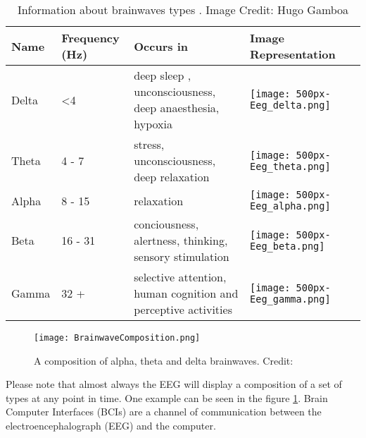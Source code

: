 \begin{table}[h]
                             
\begin{tabular}{ | C | C | C | m{8cm}C | }
\hline
\textbf{Name}  & \textbf{Frequency (Hz)} & \textbf{Occurs in} & \textbf{Image Representation} \\ \hline
Delta & \textless 4    & deep sleep , unconsciousness, deep anaesthesia, hypoxia          & \texttt{[image: 500px-Eeg\_delta.png]}        \\ \hline
Theta & 4 - 7          & stress, unconsciousness, deep relaxation          & \texttt{[image: 500px-Eeg\_theta.png]}        \\ \hline
Alpha & 8 - 15         & relaxation          & \texttt{[image: 500px-Eeg\_alpha.png]}        \\ \hline
Beta  & 16 - 31        & conciousness, alertness, thinking, sensory stimulation          & \texttt{[image: 500px-Eeg\_beta.png]}         \\ \hline
Gamma & 32 +           & selective attention, human cognition and perceptive activities         & \texttt{[image: 500px-Eeg\_gamma.png]}        \\ \hline
\end{tabular}
\caption {Information about brainwaves types \cite{musicEEG}. Image Credit: Hugo Gamboa}
\label{table:brainwaves}
\end{table}

\begin{figure}
  \centering
  \texttt{[image: BrainwaveComposition.png]}
  \caption{A composition of alpha, theta and delta brainwaves. Credit: \cite{gall1992method}}
    \label{fig:brainwaveComposition}        
\end{figure}

Please note that almost always the EEG will display a composition of a set of types at any point in time. One example can be seen in the figure \ref{fig:brainwaveComposition}. Brain Computer Interfaces (BCIs) are a channel of communication between the electroencephalograph (EEG) and the computer.

